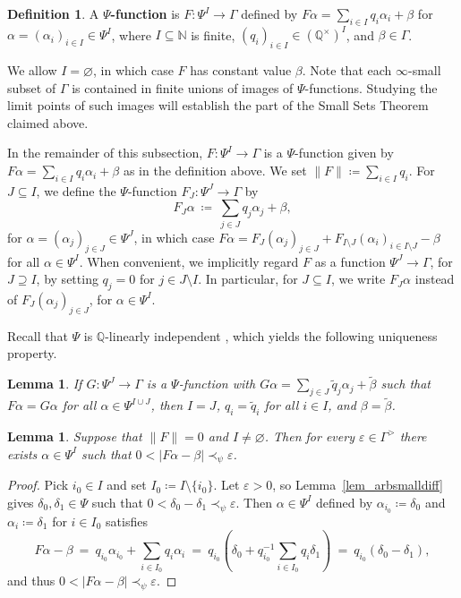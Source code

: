 \documentclass[11pt]{amsart}
\theoremstyle{plain}
\newtheorem{lemma}[thm]{Lemma}
\theoremstyle{definition}
\newtheorem*{def*}{Definition}
\numberwithin{equation}{section}
\newcommand\N{\mathbb{N}}
\newcommand\Q{\mathbb{Q}}
\newcommand\0{\varnothing}
\begin{document}
\begin{def*}
A \textbf{$\Psi$-function} is $F\colon \Psi^I\to\Gamma$ defined by $F\alpha=\sum_{i\in I}q_i\alpha_i + \beta$ for $\alpha=(\alpha_i)_{i\in I} \in \Psi^I$, where $I\subseteq \N$ is finite, $(q_i)_{i\in I} \in (\Q^{\times})^I$, and $\beta\in\Gamma$. 
\end{def*}
\noindent
We allow $I=\0$, in which case $F$ has constant value $\beta$.
Note that each $\infty$-small subset of $\Gamma$ is contained in finite unions of images of $\Psi$-functions.
Studying the limit points of such images will establish the part of the Small Sets Theorem claimed above.

\medskip\noindent
In the remainder of this subsection, $F\colon \Psi^I \to \Gamma$ is a $\Psi$-function given by $F\alpha=\sum_{i \in I}q_i\alpha_i + \beta$ as in the definition above.
We set $\|F\| \coloneqq \sum_{i\in I}q_i$. For $J \subseteq I$, we define the $\Psi$-function $F_J \colon \Psi^J \to \Gamma$ by
\[
F_J\alpha \ \coloneqq \ \sum_{j\in J}q_j\alpha_j+\beta,
\]
for $\alpha=(\alpha_j)_{j\in J}\in\Psi^J$,
in which case $F\alpha = F_J(\alpha_j)_{j\in J}+F_{I\setminus J}(\alpha_i)_{i\in I\setminus J} - \beta$ for all $\alpha \in \Psi^I$.
When convenient, we implicitly regard $F$ as a function $\Psi^J \to \Gamma$, for $J \supseteq I$, by setting $q_j=0$ for $j\in J \setminus I$.
In particular, for $J \subseteq I$, we write $F_J\alpha$ instead of $F_J(\alpha_j)_{j\in J}$, for $\alpha\in\Psi^I$. 


\medskip\noindent
Recall that $\Psi$ is $\Q$-linearly independent \cite[Lemma~6.8]{GehretACTlog}, which yields the following uniqueness property. 

\begin{lemma}\label{key_uniqueness_lemma}
If $G\colon \Psi^J \to \Gamma$ is a $\Psi$-function with $G\alpha=\sum_{j\in J}\tilde{q}_j\alpha_j + \tilde{\beta}$ such that 
$F\alpha=G\alpha$
for all $\alpha \in \Psi^{I\cup J}$, then $I=J$, $q_i=\tilde{q}_i$ for all $i \in I$, and $\beta=\tilde{\beta}$. 
\end{lemma}


\begin{lemma}\label{lem_arbsmallPsifun}
Suppose that $\|F\|=0$ and $I\neq\0$.
Then for every $\varepsilon\in\Gamma^>$ there exists $\alpha\in\Psi^I$ such that
$0 < |F\alpha-\beta| \prec_{\psi} \varepsilon$.
\end{lemma}
\begin{proof}
Pick $i_0 \in I$ and set $I_0\coloneqq I\setminus \{i_0\}$.
Let $\varepsilon>0$, so Lemma~\ref{lem_arbsmalldiff} gives $\delta_0,\delta_1\in\Psi$ such that $0<\delta_0-\delta_1\prec_{\psi}\varepsilon$. Then $\alpha\in \Psi^{I}$ defined by
$\alpha_{i_0} \coloneqq \delta_0$ and $\alpha_i \coloneqq\delta_1$ for $i \in I_0$
satisfies
\[
F\alpha-\beta \ = \ q_{i_0}\alpha_{i_0}+\textstyle\sum_{i\in I_0}q_i\alpha_i \ = \ q_{i_0}(\delta_0+q_{i_0}^{-1}\sum_{i\in I_0}q_i \delta_1) \ = \ q_{i_0}(\delta_0-\delta_1),
\]
and thus $0 < |F\alpha-\beta| \prec_{\psi} \varepsilon$.
\end{proof}
\end{document}
